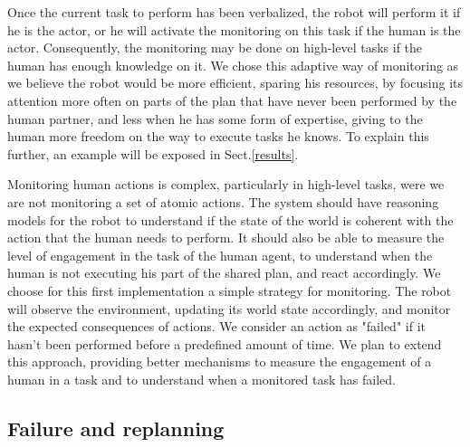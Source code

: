 \documentclass{llncs}
\begin{document}

Once the current task to perform has been verbalized, the robot will perform it if he is the actor, or he will activate the monitoring on this task if the human is the actor. Consequently, the monitoring may be done on high-level tasks if the human has enough knowledge on it.
We chose this adaptive way of monitoring as we believe the robot would be more efficient, sparing his resources, by focusing its attention more often on parts of the plan that have never been performed by the human partner, and less when he has some form of expertise, giving to the human more freedom on the way to execute tasks he knows.
To explain this further, an example will be exposed in Sect.\ref{results}.

Monitoring human actions is complex, particularly in high-level tasks, were we are not monitoring a set of atomic actions. The system should have reasoning models for the robot to understand if the state of the world is coherent with the action that the human needs to perform. It should also be able to measure the level of engagement in the task of the human agent, to understand when the human is not executing his part of the shared plan, and react accordingly.
We choose for this first implementation a simple strategy for monitoring. The robot will observe the environment, updating its world state accordingly, and monitor the expected consequences of actions. We consider an action as "failed" if it hasn't been performed before a predefined amount of time.
We plan to extend this approach, providing better mechanisms to measure the engagement of a human in a task and to understand when a monitored task has failed.


\subsection{Failure and replanning}
\end{document}
